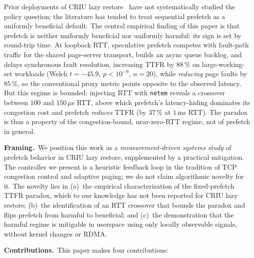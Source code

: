 \documentclass[journal]{IEEEtran}
\begin{document}
Prior deployments of CRIU lazy restore~\cite{criu-lazy, runc-lazy} have not
systematically studied the policy question; the literature has tended to
treat sequential prefetch as a uniformly beneficial default. The central
empirical finding of this paper is that prefetch is neither uniformly
beneficial nor uniformly harmful: its sign is set by round-trip time. At
loopback RTT, speculative prefetch competes with fault-path traffic for the
shared page-server transport, builds an async queue backlog, and delays
synchronous fault resolution, increasing TTFR by $88\,\%$ on large-working-set
workloads (Welch $t = -45.9$, $p < 10^{-9}$, $n = 20$), while \emph{reducing}
page faults by $85\,\%$, so the conventional proxy metric points opposite to
the observed latency. But this regime is bounded: injecting RTT with
\texttt{netem} reveals a crossover between $100$ and $150\,\mu$s RTT, above
which prefetch's latency-hiding dominates its congestion cost and prefetch
\emph{reduces} TTFR (by $37\,\%$ at $1$\,ms RTT). The paradox is thus a
property of the congestion-bound, near-zero-RTT regime, not of prefetch in
general.

\smallskip
\noindent\textbf{Framing.}\, We position this work as a
\emph{measurement-driven systems study} of prefetch behavior in CRIU lazy
restore, supplemented by a practical mitigation. The controller we
present is a heuristic feedback loop in the tradition of TCP congestion
control and adaptive paging; we do not claim algorithmic novelty for it.
The novelty lies in (a)~the empirical characterization of the
fixed-prefetch TTFR paradox, which to our knowledge has not been reported
for CRIU lazy restore; (b)~the identification of an RTT crossover that
bounds the paradox and flips prefetch from harmful to beneficial; and
(c)~the demonstration that the harmful regime is mitigable in userspace
using only locally observable signals, without kernel changes or RDMA.

\smallskip
\noindent\textbf{Contributions.}\, This paper makes four contributions:
\end{document}
